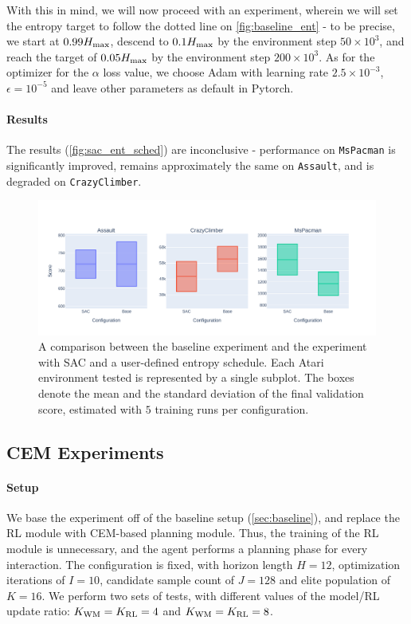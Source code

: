 \documentclass[en]{pracamgr}
\newcommand{\env}[1]{{\tt #1}}
\newcommand{\figurewidth}{\linewidth}
\newcommand{\figureheight}{0.8\paperheight}
\begin{document}
With this in mind, we will now proceed with an experiment, wherein we will set the entropy target to follow the dotted line on \autoref{fig:baseline_ent} - to be precise, we start at $0.99 H_{\rm max}$, descend to $0.1 H_{\rm max}$ by the environment step $50 \times 10^3$, and reach the target of $0.05 H_{\rm max}$ by the environment step $200 \times 10^3$. As for the optimizer for the $\alpha$ loss value, we choose Adam with learning rate $2.5 \times 10^{-3}$, $\epsilon = 10^{-5}$ and leave other parameters as default in Pytorch.

\paragraph{Results} The results (\autoref{fig:sac_ent_sched}) are inconclusive - performance on \env{MsPacman} is significantly improved, remains approximately the same on \env{Assault}, and is degraded on \env{CrazyClimber}.

\begin{figure}
  \centering
  \includegraphics[width=\figurewidth,height=\figureheight,keepaspectratio]{assets/sac.ent_sched2.pdf}
  \caption{A comparison between the baseline experiment and the experiment with SAC and a user-defined entropy schedule. Each Atari environment tested is represented by a single subplot. The boxes denote the mean and the standard deviation of the final validation score, estimated with $5$ training runs per configuration.}
  \label{fig:sac_ent_sched}
\end{figure}

\subsection{CEM Experiments}

\paragraph{Setup} We base the experiment off of the baseline setup (\autoref{sec:baseline}), and replace the RL module with CEM-based planning module. Thus, the training of the RL module is unnecessary, and the agent performs a planning phase for every interaction. The configuration is fixed, with horizon length $H = 12$, optimization iterations of $I = 10$, candidate sample count of $J = 128$ and elite population of $K = 16$. We perform two sets of tests, with different values of the model/RL update ratio: $K_{\rm WM} = K_{\rm RL} = 4$ and $K_{\rm WM} = K_{\rm RL} = 8$.
\end{document}
